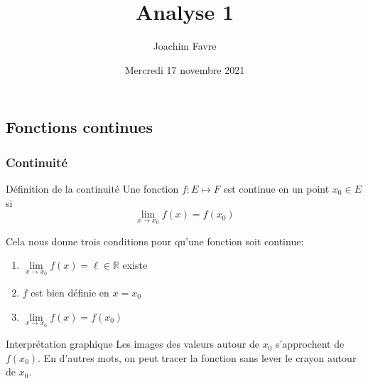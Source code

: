\documentclass[a4paper]{article}
\title{Analyse 1}
\author{Joachim Favre}
\date{Mercredi 17 novembre 2021}
\begin{document}
\maketitle


\subsection{Fonctions continues}
\subsubsection{Continuité}
\begin{parag}{Définition de la continuité}
    Une fonction $f : E \mapsto F$ est continue en un point $x_0 \in E$ si 
    \[\lim_{x \to x_0} f\left(x\right) = f\left(x_0\right)\]
    
    Cela nous donne trois conditions pour qu'une fonction soit continue:
    \begin{enumerate}
        \item $\lim\limits_{x \to x_0} f\left(x\right) = \ell \in \mathbb{R}$ existe
        \item $f$ est bien définie en $x = x_0$
        \item $\lim\limits_{x \to x_0} f\left(x\right) = f\left(x_0\right)$
    \end{enumerate}

    \begin{subparag}{Interprétation graphique}
        Les images des valeurs autour de $x_0$ s'approchent de $f\left(x_0\right)$. En d'autres mots, on peut tracer la fonction sans lever le crayon autour de $x_0$. 
    \end{subparag}
    
\end{parag}
\end{document}
